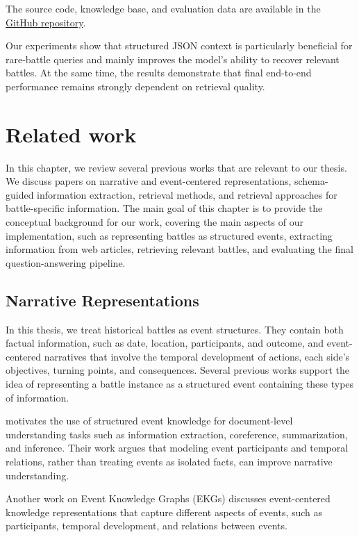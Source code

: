 The source code, knowledge base, and evaluation data are available in the \href{https://github.com/Sandora1933/HybridB}{GitHub repository}.

Our experiments show that structured JSON context is particularly beneficial for rare-battle queries and mainly improves the model’s ability to recover relevant battles. At the same time, the results demonstrate that final end-to-end performance remains strongly dependent on retrieval quality.

\chapter{Related work}
In this chapter, we review several previous works that are relevant to our thesis. We discuss papers on narrative and event-centered representations, schema-guided information extraction, retrieval methods, and retrieval approaches for battle-specific information. The main goal of this chapter is to provide the conceptual background for our work, covering the main aspects of our implementation, such as representing battles as structured events, extracting information from web articles, retrieving relevant battles, and evaluating the final question-answering pipeline.

\section{Narrative Representations}
In this thesis, we treat historical battles as event structures. They contain both factual information, such as date, location, participants, and outcome, and event-centered narratives that involve the temporal development of actions, each side’s objectives, turning points, and consequences. Several previous works support the idea of representing a battle instance as a structured event containing these types of information. 

\citet{chambers2010narrativeschemas} motivates the use of structured event knowledge for document-level understanding tasks such as information extraction, coreference, summarization, and inference. Their work argues that modeling event participants and temporal relations, rather than treating events as isolated facts, can improve narrative understanding. 

Another work on Event Knowledge Graphs (EKGs) \citep{guan2023eventkg} discusses event-centered knowledge representations that capture different aspects of events, such as participants, temporal development, and relations between events. 

